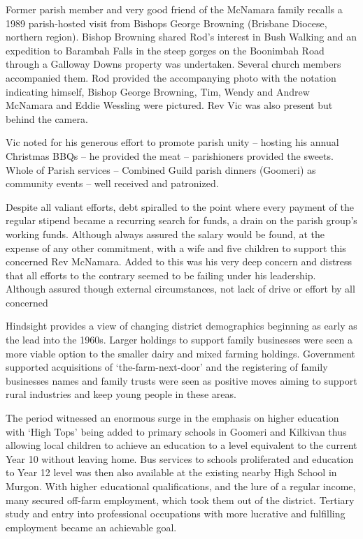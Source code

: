 Former parish member and very good friend of the McNamara family recalls
a 1989 parish-hosted visit from Bishops George Browning (Brisbane
Diocese, northern region). Bishop Browning shared Rod's interest in Bush
Walking and an expedition to Barambah Falls in the steep gorges on the
Boonimbah Road through a Galloway Downs property was undertaken. Several
church members accompanied them. Rod provided the accompanying photo
with the notation indicating himself, Bishop George Browning, Tim, Wendy
and Andrew McNamara and Eddie Wessling were pictured. Rev Vic was also
present but behind the camera.

Vic noted for his generous effort to promote parish unity -- hosting his
annual Christmas BBQs -- he provided the meat -- parishioners provided
the sweets. Whole of Parish services -- Combined Guild parish dinners
(Goomeri) as community events -- well received and patronized.

Despite all valiant efforts, debt spiralled to the point where every
payment of the regular stipend became a recurring search for funds, a
drain on the parish group's working funds. Although always assured the
salary would be found, at the expense of any other commitment, with a
wife and five children to support this concerned Rev McNamara. Added to
this was his very deep concern and distress that all efforts to the
contrary seemed to be failing under his leadership. Although assured
though external circumstances, not lack of drive or effort by all
concerned

Hindsight provides a view of changing district demographics beginning as
early as the lead into the 1960s. Larger holdings to support family
businesses were seen a more viable option to the smaller dairy and mixed
farming holdings. Government supported acquisitions of
`the-farm-next-door' and the registering of family businesses names and
family trusts were seen as positive moves aiming to support rural
industries and keep young people in these areas.

The period witnessed an enormous surge in the emphasis on higher
education with `High Tops' being added to primary schools in Goomeri and
Kilkivan thus allowing local children to achieve an education to a level
equivalent to the current Year 10 without leaving home. Bus services to
schools proliferated and education to Year 12 level was then also
available at the existing nearby High School in Murgon. With higher
educational qualifications, and the lure of a regular income, many
secured off-farm employment, which took them out of the district.
Tertiary study and entry into professional occupations with more
lucrative and fulfilling employment became an achievable goal.

